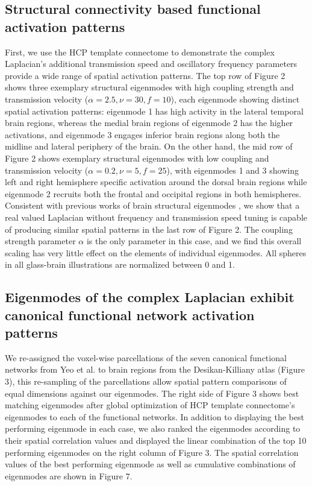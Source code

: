 \documentclass{article}
\begin{document}
\subsection{Structural connectivity based functional activation patterns}
First, we use the HCP template connectome to demonstrate the complex Laplacian's additional transmission speed and oscillatory frequency parameters provide a wide range of spatial activation patterns. The top row of Figure 2 shows three exemplary structural eigenmodes with high coupling strength and transmission velocity ($\alpha = 2.5, \nu = 30, f = 10$), each eigenmode showing distinct spatial activation patterns: eigenmode 1 has high activity in the lateral temporal brain regions, whereas the medial brain regions of eigenmode 2 has the higher activations, and eigenmode 3 engages inferior brain regions along both the midline and lateral periphery of the brain. On the other hand, the mid row of Figure 2 shows exemplary structural eigenmodes with low coupling and transmission velocity ($\alpha = 0.2, \nu = 5, f = 25$), with eigenmodes 1 and 3 showing left and right hemisphere specific activation around the dorsal brain regions while eigenmode 2 recruits both the frontal and occipital regions in both hemispheres. Consistent with previous works of brain structural eigenmodes \cite{Atasoy2016}, we show that a real valued Laplacian without frequency and transmission speed tuning is capable of producing similar spatial patterns in the last row of Figure 2. The coupling strength parameter $\alpha$ is the only parameter in this case, and we find this overall scaling has very little effect on the elements of individual eigenmodes. All spheres in all glass-brain illustrations are normalized between 0 and 1. 

\subsection{Eigenmodes of the complex Laplacian exhibit canonical functional network activation patterns}
We re-assigned the voxel-wise parcellations of the seven canonical functional networks from Yeo et al. \cite{Yeo2011} to brain regions from the Desikan-Killiany atlas (Figure 3), this re-sampling of the parcellations allow spatial pattern comparisons of equal dimensions against our eigenmodes. The right side of Figure 3 shows best matching eigenmodes after global optimization of HCP template connectome's eigenmodes to each of the functional networks. In addition to displaying the best performing eigenmode in each case, we also ranked the eigenmodes according to their spatial correlation values and displayed the linear combination of the top 10 performing eigenmodes on the right column of Figure 3. The spatial correlation values of the best performing eigenmode as well as cumulative combinations of eigenmodes are shown in Figure 7.
\end{document}
